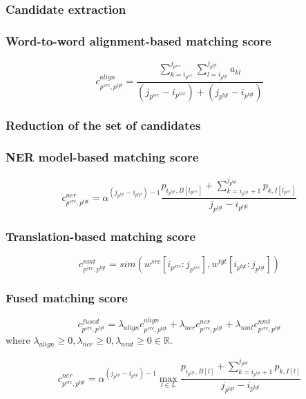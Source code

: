 \documentclass{beamer}
\newcommand{\src}[1]{#1^{src}}
\newcommand{\tgt}[1]{#1^{tgt}}
\begin{document}
\begin{frame}
  \frametitle{Candidate extraction}
\end{frame}

\begin{frame}
  \frametitle{Word-to-word alignment-based matching score}

  \begin{equation*}
    c_{\src{p}, \tgt{p}}^{align} =
    \frac{\sum\limits_{k=i_{\src{p}}}^{j_{\src{p}}} \sum\limits_{l=i_{\tgt{p}}}^{j_{\tgt{p}}} a_{kl}}
    {(j_{\src{p}} - i_{\src{p}}) + (j_{\tgt{p}} - i_{\tgt{p}})}
  \end{equation*}
\end{frame}

\begin{frame}
  \frametitle{Reduction of the set of candidates}
\end{frame}

\begin{frame}
  \frametitle{NER model-based matching score}

  \begin{equation*}
    c_{\src{p}, \tgt{p}}^{ner} = \alpha^{(j_{\tgt{p}} - i_{\tgt{p}}) - 1}
    \frac{
      p_{i_{\tgt{p}}, B[l_{\src{p}}]} +
      \sum\limits_{k = i_{\tgt{p}} + 1}^{j_{\tgt{p}}} p_{k, I[l_{\src{p}}]}
    }
    {j_{\tgt{p}} - i_{\tgt{p}}}
  \end{equation*}
\end{frame}

\begin{frame}
  \frametitle{Translation-based matching score}

  \begin{equation*}
    c_{\src{p}, \tgt{p}}^{nmt} =
    sim \left(\src{w}[i_{\src{p}} : j_{\src{p}}],
    \tgt{w}[i_{\tgt{p}} : j_{\tgt{p}}] \right)
  \end{equation*}
\end{frame}

\begin{frame}
  \frametitle{Fused matching score}

  \begin{equation*}
    c_{\src{p}, \tgt{p}}^{fused} =
    \lambda_{align} c_{\src{p}, \tgt{p}}^{align} +
    \lambda_{ner} c_{\src{p}, \tgt{p}}^{ner} +
    \lambda_{nmt} c_{\src{p}, \tgt{p}}^{nmt}
  \end{equation*}
  where \( \lambda_{align} \geq 0, \lambda_{ner} \geq 0, \lambda_{nmt} \geq 0 \in \mathbb{R}\).

  \begin{equation*}
    c_{\src{p}, \tgt{p}}^{ner} = \alpha^{(j_{\tgt{p}} - i_{\tgt{p}}) - 1}
    \max\limits_{l \in L}
    \frac{
      p_{i_{\tgt{p}}, B[l]} +
      \sum\limits_{k = i_{\tgt{p}} + 1}^{j_{\tgt{p}}} p_{k, I[l]}
    }
    {j_{\tgt{p}} - i_{\tgt{p}}}
  \end{equation*}
\end{frame}
\end{document}
